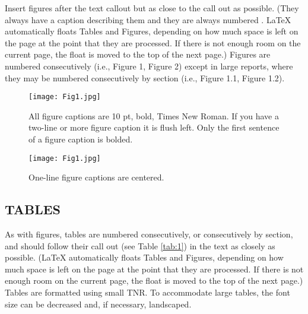 \documentclass[11pt,letterpaper,twoside,english,final]{article}
\begin{document}
{Insert figures after the text callout but as close to the call out as possible. (They always have a caption describing them and they are always numbered . LaTeX automatically floats Tables and Figures, depending on how much space is left on the page at the point that they are processed. If there is not enough room on the current page, the float is moved to the top of the next page.) Figures are numbered consecutively (i.e., Figure 1, Figure 2) except in large reports, where they may be numbered consecutively by section (i.e., Figure 1.1, Figure 1.2). 

\begin{figure}[h]
\centering
\texttt{[image: Fig1.jpg]} 
\vspace{-.1in}

\flushleft\caption[All figure captions are 10 pt, bold, Times New Roman.]{All figure captions are 10 pt, bold, Times New Roman. \textmd{If you have a two-line or more figure caption it is flush left. Only the first sentence of a figure caption is bolded.}}
\end{figure}


\begin{figure}[h]
\centering
\texttt{[image: Fig1.jpg]}  
\vspace{-.1in}
\caption{One-line figure captions are centered.}
\end{figure}
\begin{center}
\end{center}


\newpage
\clearemptydoublepage

\begin{center}
\section{TABLES}

\end{center}

As with figures, tables are numbered consecutively, or consecutively by section, and should follow their call out (see {\color{green} Table \ref{tab:1}}) in the text as closely as possible.  (LaTeX automatically floats Tables and Figures, depending on how much space is left on the page at the point that they are processed. If there is not enough room on the current page, the float is moved to the top of the next page.) Tables are formatted using small TNR. To accommodate large tables, the font size can be decreased and, if necessary, landscaped. 

}
\end{document}
